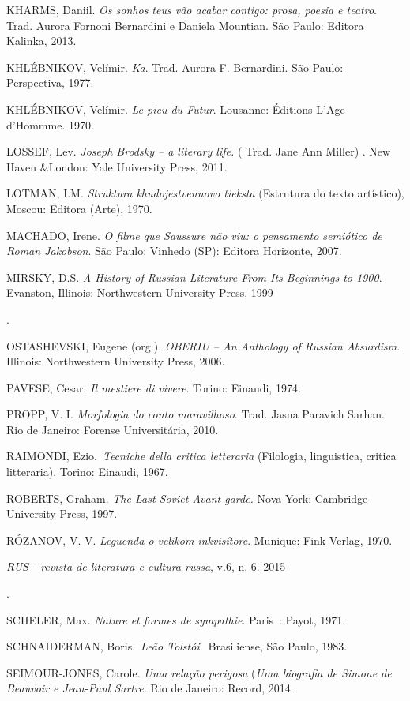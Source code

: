 KHARMS, Daniil. \emph{Os sonhos teus vão acabar contigo: prosa, poesia e
teatro}. Trad. Aurora Fornoni Bernardini e Daniela Mountian. São Paulo:
Editora Kalinka, 2013.

KHLÉBNIKOV, Velímir. \emph{Ka}. Trad. Aurora F. Bernardini. São Paulo:
Perspectiva, 1977.

KHLÉBNIKOV, Velímir. \emph{Le pieu du Futur}. Lousanne: Éditions L'Age
d'Hommme. 1970.

LOSSEF, Lev. \emph{Joseph Brodsky -- a literary life.} ( Trad. Jane Ann
Miller) . New Haven \&London: Yale University Press, 2011.

LOTMAN, I.M. \emph{Struktura khudojestvennovo tieksta} (Estrutura do
texto artístico), Moscou: Editora (Arte), 1970.

MACHADO, Irene. \emph{O filme que Saussure não viu: o pensamento
semiótico de Roman Jakobson}. São Paulo: Vinhedo (SP): Editora
Horizonte, 2007.

MIRSKY, D.S. \emph{A History of Russian Literature From Its Beginnings
to 1900}. Evanston, Illinois: Northwestern University Press, 1999

.

OSTASHEVSKI, Eugene (org.). \emph{OBERIU -- An Anthology of Russian
Absurdism}. Illinois: Northwestern University Press, 2006.

PAVESE, Cesar. \emph{Il mestiere di vivere}. Torino: Einaudi, 1974.

PROPP, V. I. \emph{Morfologia do conto maravilhoso}. Trad. Jasna
Paravich Sarhan. Rio de Janeiro: Forense Universitária, 2010.

RAIMONDI, Ezio.~\emph{Tecniche della critica letteraria} (Filologia,
linguistica, critica litteraria). Torino: Einaudi, 1967.

ROBERTS, Graham. \emph{The Last Soviet Avant-garde.} Nova York:
Cambridge University Press, 1997.

RÓZANOV, V. V. \emph{Leguenda o velikom inkvisítore}. Munique: Fink
Verlag, 1970.

\emph{RUS - revista de literatura e cultura russa}, v.6, n. 6. 2015

.

SCHELER\emph{,} Max. \emph{Nature et formes de sympathie}. Paris~:
Payot, 1971.

SCHNAIDERMAN, Boris.~\emph{Leão Tolstói}.~Brasiliense, São Paulo, 1983.

SEIMOUR-JONES, Carole. \emph{Uma relação perigosa} (\emph{Uma biografia
de Simone de Beauvoir e Jean-Paul Sartre.} Rio de Janeiro: Record, 2014.


